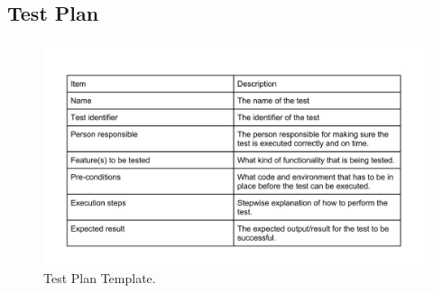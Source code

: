 \subsection{Test Plan}
\begin{figure}[hthp]
\begin{center}
\includegraphics[width = \textwidth/3*2]{Appendix/testplanTemp.jpg}
\caption{Test Plan Template.}
\label{Template}
\end{center}
\end{figure}
